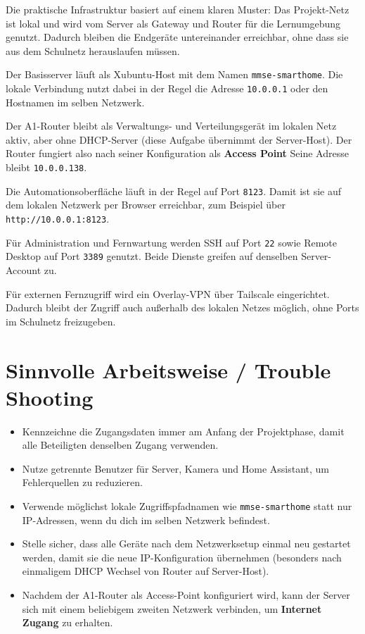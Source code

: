 Die praktische Infrastruktur basiert auf einem klaren Muster: Das Projekt-Netz ist lokal und wird vom Server als Gateway und Router für die Lernumgebung genutzt. Dadurch bleiben die Endgeräte untereinander erreichbar, ohne dass sie aus dem Schulnetz herauslaufen müssen.

\begin{description}[leftmargin=1.8em,style=nextline]
    \item[Server-Host] Der Basisserver läuft als Xubuntu-Host mit dem Namen \texttt{mmse-smarthome}. Die lokale Verbindung nutzt dabei in der Regel die Adresse \texttt{10.0.0.1} oder den Hostnamen im selben Netzwerk.
    \item[Router] Der A1-Router bleibt als Verwaltungs- und Verteilungsgerät im lokalen Netz aktiv, aber ohne DHCP-Server (diese Aufgabe übernimmt der Server-Host). Der Router fungiert also nach seiner Konfiguration als \textbf{Access Point} Seine Adresse bleibt \texttt{10.0.0.138}.
    \item[Home Assistant] Die Automationsoberfläche läuft in der Regel auf Port \texttt{8123}. Damit ist sie auf dem lokalen Netzwerk per Browser erreichbar, zum Beispiel über \texttt{http://10.0.0.1:8123}.
    \item[SSH und RDP] Für Administration und Fernwartung werden SSH auf Port \texttt{22} sowie Remote Desktop auf Port \texttt{3389} genutzt. Beide Dienste greifen auf denselben Server-Account zu.
    \item[Tailscale]  Für externen Fernzugriff wird ein Overlay-VPN über Tailscale eingerichtet. Dadurch bleibt der Zugriff auch außerhalb des lokalen Netzes möglich, ohne Ports im Schulnetz freizugeben.
\end{description}

\section{Sinnvolle Arbeitsweise / Trouble Shooting}

\begin{itemize}[leftmargin=1.3em,label=\textcolor{SmartTeal}{\small\textbullet}]
    \item Kennzeichne die Zugangsdaten immer am Anfang der Projektphase, damit alle Beteiligten denselben Zugang verwenden.
    \item Nutze getrennte Benutzer für Server, Kamera und Home Assistant, um Fehlerquellen zu reduzieren.
    \item Verwende möglichst lokale Zugriffspfadnamen wie \texttt{mmse-smarthome} statt nur IP-Adressen, wenn du dich im selben Netzwerk befindest.
    \item Stelle sicher, dass alle Geräte nach dem Netzwerksetup einmal neu gestartet werden, damit sie die neue IP-Konfiguration übernehmen (besonders nach einmaligem DHCP Wechsel von Router auf Server-Host).
    \item {} Nachdem der A1-Router als Access-Point konfiguriert wird, kann der Server sich mit einem beliebigem zweiten Netzwerk verbinden, um \textbf{Internet Zugang} zu erhalten. 
\end{itemize}
